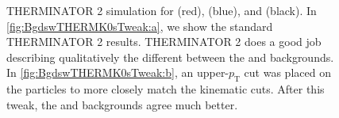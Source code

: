 \documentclass[/home/jesse/Analysis/FemtoAnalysis/AnalysisNotes/AnalysisNoteJBuxton.tex]{subfiles}
\begin{document}
\begin{figure}[h!]
  \centering
  \caption[Backgrounds with THERMINATOR, \Ks Tweak]{THERMINATOR 2 simulation for \LamKchP (red), \LamKchM (blue), and \LamKs (black).  In \ref{fig:BgdswTHERMK0sTweak:a}, we show the standard THERMINATOR 2 results.  THERMINATOR 2 does a good job describing qualitatively the different between the \LamKpm and \LamKs backgrounds.  In \ref{fig:BgdswTHERMK0sTweak:b}, an upper-$p_{\mathrm{T}}$ cut was placed on the \Ks particles to more closely match the \Kpm kinematic cuts.  After this tweak, the \LamKpm and \LamKs backgrounds agree much better.}
  \label{fig:BgdswTHERMK0sTweak}
\end{figure}
\end{document}
